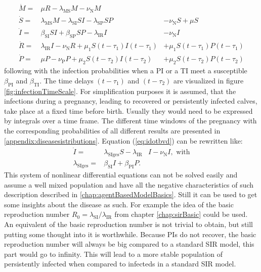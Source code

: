 \begin{eqnarray}
\dot{M}  =& \mu R-\lambda_\text{MS} M -\nu_\text{N} M & \label{eq:m1}\\
\dot{S}  =& \lambda_\text{MS} M - \lambda_\text{SI}SI-\lambda_\text{SP} SP &-\nu_\text{N} S + \mu S \\
\dot{I}  =& \beta_\text{SI}SI+\beta_\text{SP} SP - \lambda_\text{IR} I &- \nu_\text{N} I \label{eq:idotbvd} \\
\dot{R}  =& \lambda_\text{IR}I - \nu_\text{N} R +\mu_1S(t-\tau_1)I(t-\tau_1) &+\mu_1S(t-\tau_1)P(t-\tau_1) \\ 
\dot{P}  =&  \mu P -\nu_\text{P}P + \mu_2S(t-\tau_2)I(t-\tau_2) &+ \mu_2S(t-\tau_2)P(t-\tau_2) \label{eq:p1}
\end{eqnarray}
following \citep{BAS16} with the infection probabilities when a PI or a TI meet a susceptible $\beta_\text{PI}$ and $\beta_\text{TI}$. The time delays $(t-\tau_1)$ and $(t-\tau_2)$ are visualized in figure \ref{fig:infectionTimeScale}. For simplification purposes it is assumed, that the infections during a pregnancy, leading to recovered or persistently infected calves, take place at a fixed time before birth. Usually they would need to be expressed by integrals over a time frame. The different time windows of the pregnancy with the corresponding probabilities of all different results are presented in \ref{appendix:diseasesistributions}. Equation (\ref{eq:idotbvd}) can be rewritten like:
\begin{eqnarray}
\dot{I}  =& \lambda_\text{SIges}S - \lambda_\text{IR}&I - \nu_\text{N} I, \text{ with} \\
\lambda_\text{SIges} =& \beta_\text{SI} I+ \beta_\text{PI} P.& \label{eq:vie04start}
\end{eqnarray}
This system of nonlinear differential equations can not be solved easily and assume a well mixed population and have all the negative characteristics of such description described in \ref{chap:agentBasedModelBasics}. Still it can be used to get some insights about the disease as such. For example the idea of the basic reproduction number $R_0=\lambda_\text{SI} / \lambda_\text{IR}$ from chapter \ref{chap:sirBasic} could be used. An equivalent of the basic reproduction number is not trivial to obtain, but still putting some thought into it is worthwhile. 
Because PIs do not recover, the basic reproduction number will always be big compared to a standard SIR model, this part would go to infinity. This will lead to a more stable population of persistently infected when compared to infecteds in a standard SIR model.

